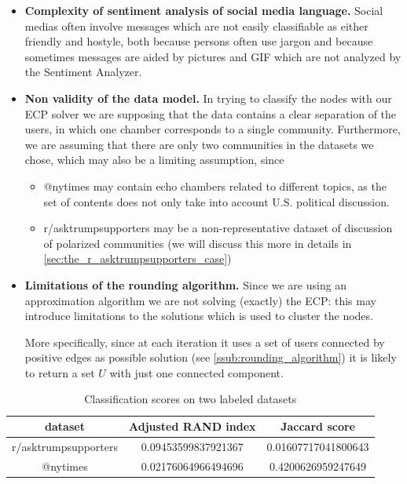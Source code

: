 \begin{itemize}
	\item \textbf{Complexity of sentiment analysis of social media language.}
	      Social medias often involve messages which are not easily classifiable
	      as either friendly and hostyle, both because persons often use jargon
	      and because sometimes messages are aided by pictures and GIF which
	      are not analyzed by the Sentiment Analyzer.
	\item \textbf{Non validity of the data model.} In trying to classify the
	      nodes with our \acrshort{ECP} solver we are supposing that the data
	      contains a clear separation of the users, in which one chamber
	      corresponds to a single community. Furthermore, we are assuming that
	      there are only two communities in the datasets we chose, which may also
	      be a limiting assumption, since
	      \begin{itemize}
		      \item @nytimes may contain echo chambers related to different
		            topics, as the set of contents does not only take into account
		            U.S. political discussion.
		      \item r/asktrumpsupporters may be a non-representative
		            dataset of discussion of polarized communities (we will
		            discuss this more in details in
		            \autoref{sec:the_r_asktrumpsupporters_case})
	      \end{itemize}
	\item \textbf{Limitations of the rounding algorithm.} Since we are
	      using an approximation algorithm we are not solving (exactly) the
	      \acrshort{ECP}: this may introduce limitations to the solutions which
	      is used to cluster the nodes.

	      More specifically, since at each iteration it uses a set of users
	      connected by positive edges as possible solution (see
	      \autoref{ssub:rounding_algorithm}) it is likely to return
	      a set $U$ with just one connected component.

\end{itemize}

\begin{table}
	\centering
	\caption{Classification scores on two labeled datasets}
	\label{tab:scores-datasets-labeled}
	\begin{tabular}{c|c|c}
		dataset                     & Adjusted RAND index       & Jaccard score             \\
		\hline r/asktrumpsupporters & \num{0.09453599837921367} & \num{0.01607717041800643} \\
		@nytimes                    & \num{0.02176064966494696} & \num{0.4200626959247649}  \\
	\end{tabular}
\end{table}

